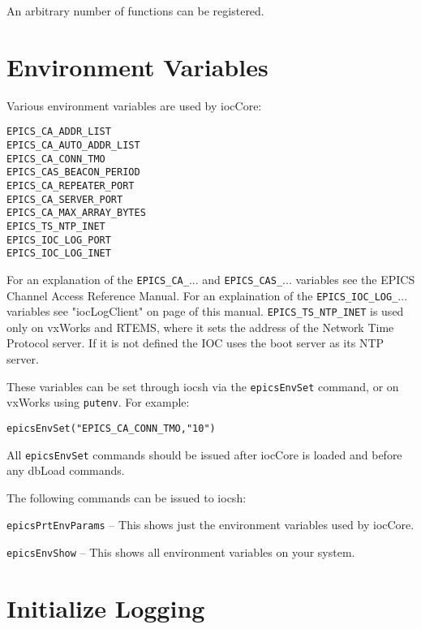 An arbitrary number of functions can be registered.

\section{Environment Variables}

Various environment variables are used by iocCore:

\begin{verbatim}
EPICS_CA_ADDR_LIST
EPICS_CA_AUTO_ADDR_LIST
EPICS_CA_CONN_TMO
EPICS_CAS_BEACON_PERIOD
EPICS_CA_REPEATER_PORT
EPICS_CA_SERVER_PORT
EPICS_CA_MAX_ARRAY_BYTES
EPICS_TS_NTP_INET
EPICS_IOC_LOG_PORT
EPICS_IOC_LOG_INET
\end{verbatim}

For an explanation of the \verb|EPICS_CA_|... and \verb|EPICS_CAS_|... variables see the EPICS Channel Access Reference Manual.
For an explaination of the \verb|EPICS_IOC_LOG_|... variables see "iocLogClient" on page \pageref{iocLogClient} of this manual.
\verb|EPICS_TS_NTP_INET| is used only on vxWorks and RTEMS, where it sets the address of the Network Time Protocol server.
If it is not defined the IOC uses the boot server as its NTP server.

These variables can be set through iocsh via the \verb|epicsEnvSet| command, or on vxWorks using \verb|putenv|.
For example:

\begin{verbatim}
epicsEnvSet("EPICS_CA_CONN_TMO,"10")
\end{verbatim}

All \verb|epicsEnvSet| commands should be issued after iocCore is loaded and before any dbLoad commands.

The following commands can be issued to iocsh:

\verb|epicsPrtEnvParams| -- This shows just the environment variables used by iocCore.

\verb|epicsEnvShow| -- This shows all environment variables on your system.

\section{Initialize Logging}

